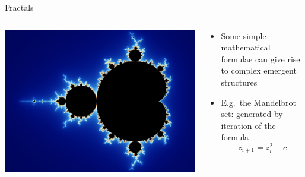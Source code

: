 \begin{frame}{Fractals}
	\begin{columns}
		\begin{column}{0.4\textwidth}
			\includegraphics[width=\textwidth]{mandelbrot}
		\end{column}
		\begin{column}{0.55\textwidth}
			\begin{itemize}
                \pause\item Some simple mathematical formulae can give rise to complex emergent structures
                \pause\item E.g.\ the Mandelbrot set: generated by iteration of the formula 
                    $$ z_{i+1} = z_i^2 + c $$
			\end{itemize}
		\end{column}
	\end{columns}
\end{frame}

